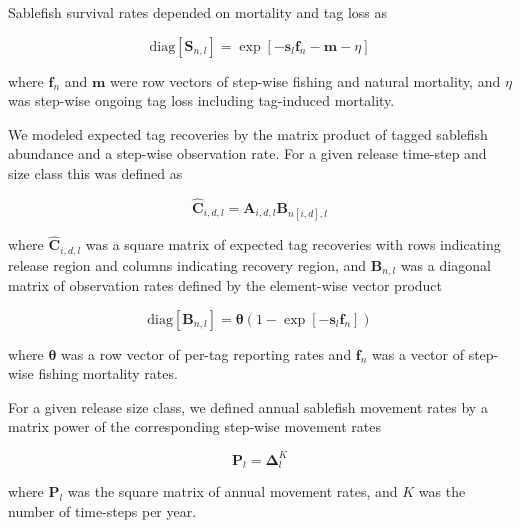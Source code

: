 \documentclass{article}
\begin{document}
Sablefish survival rates depended on mortality and tag loss as

\begin{equation}
  \label{eq:survival}
  \mathrm{diag} \! \left[\boldsymbol{S}_{n,l}\right] = 
    \exp\!{\left[-\boldsymbol{s}_l \boldsymbol{f}_n - \boldsymbol{m} - \eta \right]}
\end{equation}

\noindent where $\boldsymbol{f}_n$ and $\boldsymbol{m}$ were row vectors of step-wise fishing and natural mortality, and $\eta$ was step-wise ongoing tag loss including tag-induced mortality. 

We modeled expected tag recoveries by the matrix product of tagged sablefish abundance and a step-wise observation rate. For a given release time-step and size class this was defined as

\begin{equation}
  \label{eq:expected}
  \boldsymbol{\widehat{C}}_{i,d,l} = \boldsymbol{A}_{i,d,l} \boldsymbol{B}_{n[i,d],l}
\end{equation}

\noindent where $\boldsymbol{\widehat{C}}_{i,d,l}$ was a square matrix of expected tag recoveries with rows indicating release region and columns indicating recovery region, and $\boldsymbol{B}_{n,l}$ was a diagonal matrix of observation rates defined by the element-wise vector product

\begin{equation}
  \label{eq:observation}
  \mathrm{diag} \! \left[\boldsymbol{B}_{n,l}\right] = 
    \boldsymbol{\theta} \left(1 - \exp\!{\left[-\boldsymbol{s}_l \boldsymbol{f}_{n} \right]} \right) 
\end{equation}

\noindent where $\boldsymbol{\theta}$ was a row vector of per-tag reporting rates and $\boldsymbol{f}_n$ was a vector of step-wise fishing mortality rates.

For a given release size class, we defined annual sablefish movement rates by a matrix power of the corresponding step-wise movement rates

\begin{equation}
    \label{eq:movement}
    \boldsymbol{P}_{l} = \boldsymbol{\Delta}_{l}^K
\end{equation}

\noindent where $\boldsymbol{P}_{l}$ was the square matrix of annual movement rates, and $K$ was the number of time-steps per year.
\end{document}
